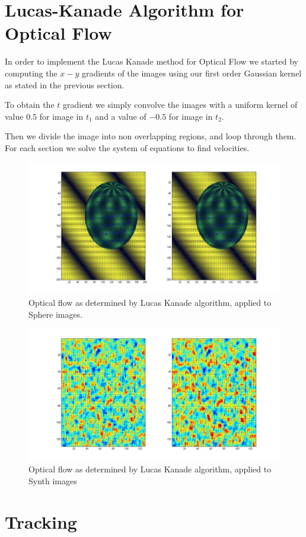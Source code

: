 \documentclass[11pt]{article}
\begin{document}
\section{Lucas-Kanade Algorithm for Optical Flow}
In order to implement the Lucas Kanade method for Optical Flow we started by computing the $x-y$ gradients of the images using our first order Gaussian kernel as stated in the previous section. 

To obtain the $t$ gradient we simply convolve the images with a uniform kernel of value $0.5$ for image in $t_1$ and a value of $- 0.5$ for image in $t_2$. 

Then we divide the image into non overlapping regions, and loop through them. For each section we solve the system of equations to find velocities.

\begin{figure}[H] \centering
	\includegraphics[width=.8\textwidth]{imgs/sphere.jpg}
	\caption{Optical flow as determined by Lucas Kanade algorithm, applied to Sphere images.}
	\label{fig:sphere_lucas}
\end{figure}

\begin{figure}[H] \centering
	\includegraphics[width=.8\textwidth]{imgs/synth.jpg}
	\caption{Optical flow as determined by Lucas Kanade algorithm, applied to Synth images}
	\label{fig:synth_lucas}
\end{figure}


\section{Tracking}
\end{document}
